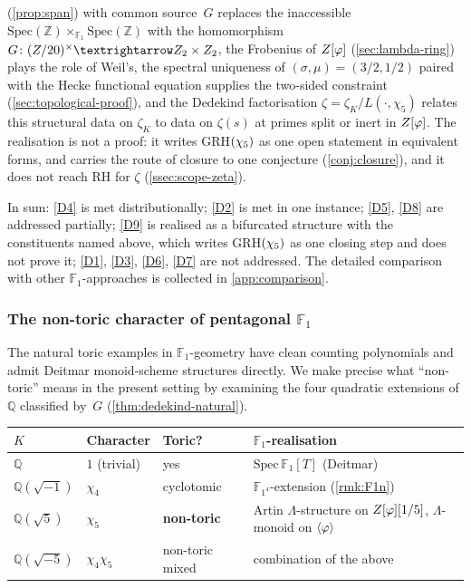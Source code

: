 \begin{description}[leftmargin=*,nosep]
  \textup{(\cref{prop:span})} with common source~$G$ replaces
  the inaccessible
  $\mathrm{Spec}(\mathbb{Z})\times_{\mathbb{F}_1}\mathrm{Spec}(\mathbb{Z})$
  with the homomorphism $G\colon\Zst\to\mathbb{Z}_2\times\mathbb{Z}_2$, the
  Frobenius of $Z[\varphi]$ (\cref{sec:lambda-ring}) plays the role of Weil's, the spectral uniqueness of $(\sigma,\mu)=(3/2,1/2)$
  paired with the Hecke functional equation supplies the
  two-sided constraint
  \textup{(\cref{sec:topological-proof})}, and the Dedekind factorisation
  $\zeta = \zeta_K/L(\cdot,\chi_5)$ relates this structural data
  on $\zeta_K$ to data on $\zeta(s)$ at primes split or inert
  in $Z[\varphi]$.  The realisation is not a proof: it writes GRH$(\chi_5)$ as one open statement in equivalent forms, and carries the route of closure to one conjecture
  (\cref{conj:closure}),
  and it does not reach RH for $\zeta$ (\cref{ssec:scope-zeta}).
\end{description}

In sum: \ref{D4} is met distributionally; \ref{D2} is met in one instance;
\ref{D5}, \ref{D8} are addressed partially; \ref{D9} is realised as a bifurcated
structure with the constituents named above, which writes GRH$(\chi_5)$ as one closing step and does not prove it; \ref{D1}, \ref{D3}, \ref{D6}, \ref{D7} are not addressed.  The
detailed comparison with other $\mathbb{F}_1$-approaches is
collected in \cref{app:comparison}.

\subsubsection{The non-toric character of pentagonal $\mathbb{F}_1$}
\label{ssec:non-toric}

The natural toric examples in $\mathbb{F}_1$-geometry have clean
counting polynomials and admit Deitmar monoid-scheme structures
directly.  We make precise what
``non-toric'' means in the present setting by examining the four
quadratic extensions of $\mathbb{Q}$ classified by~$G$
(\cref{thm:dedekind-natural}).

\begin{center}
\small
\begin{tabular}{@{}llll@{}}
\toprule
$K$ & Character & Toric? & $\mathbb{F}_1$-realisation \\
\midrule
$\mathbb{Q}$ & $1$ (trivial) & yes
  & $\mathrm{Spec}\,\mathbb{F}_1[T]$ (Deitmar) \\
$\mathbb{Q}(\sqrt{-1})$ & $\chi_4$ & cyclotomic
  & $\mathbb{F}_{1^4}$-extension (\cref{rmk:F1n}) \\
$\mathbb{Q}(\sqrt{5})$ & $\chi_5$ & \textbf{non-toric}
  & Artin $\Lambda$-structure on $Z[\varphi][1/5]$, $\Lambda$-monoid on $\langle\varphi\rangle$ \\
$\mathbb{Q}(\sqrt{-5})$ & $\chi_4\chi_5$ & non-toric mixed
  & combination of the above \\
\bottomrule
\end{tabular}
\end{center}

